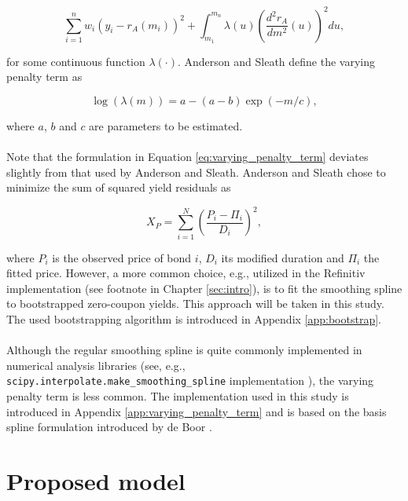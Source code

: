 \documentclass[a4paper]{artikel3}
\numberwithin{equation}{section}
\numberwithin{theorem}{section}
\numberwithin{proposition}{section}
\numberwithin{lemma}{section}
\begin{document}
\begin{equation}
    \label{eq:varying_penalty_term}
    \sum_{i=1}^n w_i (y_i - r_{A}(m_i))^2 + \int_{m_1}^{m_n} \lambda(u) \left( \frac{d^2 r_{A}}{d m^2}(u) \right)^2 du ,
\end{equation}

for some continuous function $\lambda(\cdot)$. Anderson and Sleath define the varying penalty term as 

\begin{equation*}
    \log(\lambda(m)) = a - (a - b)\exp(-m / c) ,
\end{equation*}

where $a$, $b$ and $c$ are parameters to be estimated. \\
\\
Note that the formulation in Equation \eqref{eq:varying_penalty_term} deviates slightly from that used by Anderson and Sleath. Anderson and Sleath chose to minimize the sum of squared yield residuals as 

\begin{equation*}
    X_P = \sum_{i=1}^N \left( \frac{P_i - \Pi_i}{D_i} \right)^2 ,
\end{equation*}

where $P_i$ is the observed price of bond $i$, $D_i$ its modified duration and $\Pi_i$ the fitted price. However, a more common choice, e.g., utilized in the Refinitiv implementation (see footnote in Chapter \ref{sec:intro}), is to fit the smoothing spline to bootstrapped zero-coupon yields. This approach will be taken in this study. The used bootstrapping algorithm is introduced in Appendix \ref{app:bootstrap}. \\
\\
Although the regular smoothing spline is quite commonly implemented in numerical analysis libraries (see, e.g., \texttt{scipy.interpolate.make\_smoothing\_spline} implementation \cite{scipy}), the varying penalty term is less common. The implementation used in this study is introduced in Appendix \ref{app:varying_penalty_term} and is based on the basis spline formulation introduced by de Boor \cite{de_boor_2003}.


\clearpage


\section{Proposed model}
\label{sec:model}
\end{document}
